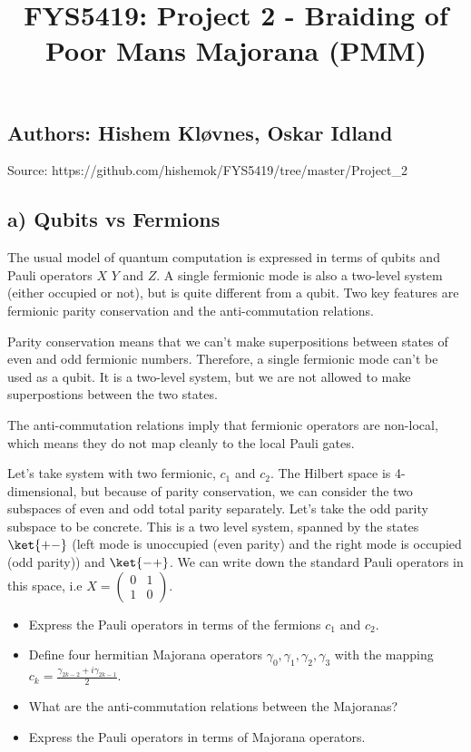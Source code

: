 \documentclass[11pt,landscape]{article}
\title{FYS5419: Project 2 - Braiding of Poor Mans Majorana (PMM)}
\providecommand{\tightlist}{%
      \setlength{\itemsep}{0pt}\setlength{\parskip}{0pt}}
\begin{document}
    
    \maketitle
    
    

    
\subsection{Authors: Hishem Kløvnes, Oskar
Idland}\label{authors-hishem-kluxf8vnes-oskar-idland}

Source: https://github.com/hishemok/FYS5419/tree/master/Project\_2

    \subsection{a) Qubits vs Fermions}\label{a-qubits-vs-fermions}

The usual model of quantum computation is expressed in terms of qubits
and Pauli operators \(X\) \(Y\) and \(Z\). A single fermionic mode is
also a two-level system (either occupied or not), but is quite different
from a qubit. Two key features are fermionic parity conservation and the
anti-commutation relations.

Parity conservation means that we can't make superpositions between
states of even and odd fermionic numbers. Therefore, a single fermionic
mode can't be used as a qubit. It is a two-level system, but we are not
allowed to make superpostions between the two states.

The anti-commutation relations imply that fermionic operators are
non-local, which means they do not map cleanly to the local Pauli gates.

Let's take system with two fermionic, \(c_1\) and \(c_2\). The Hilbert
space is 4-dimensional, but because of parity conservation, we can
consider the two subspaces of even and odd total parity separately.
Let's take the odd parity subspace to be concrete. This is a two level
system, spanned by the states \(\ket{+ -}\) (left mode is unoccupied
(even parity) and the right mode is occupied (odd parity)) and
\(\ket{ - +}\). We can write down the standard Pauli operators in this
space, i.e \(X = \begin{pmatrix} 0 &1\\1&0 \end{pmatrix}\).

\begin{itemize}
\tightlist
\item
  Express the Pauli operators in terms of the fermions \(c_1\) and
  \(c_2\).
\item
  Define four hermitian Majorana operators \(γ_0,γ_1,γ_2,γ_3\) with the
  mapping \(c_k=\displaystyle \frac{γ_{2k-2} + iγ_{2k-1}}{2}\).
\item
  What are the anti-commutation relations between the Majoranas?
\item
  Express the Pauli operators in terms of Majorana operators.
\end{itemize}
\end{document}
